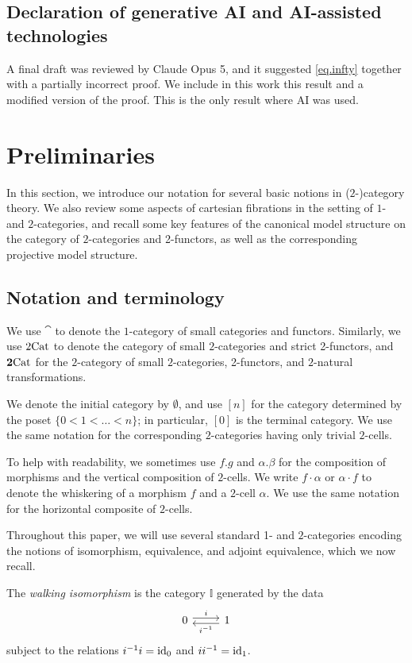 \documentclass[11pt, dvipsnames]{amsart}
\begin{document}
\subsection*{Declaration of generative AI and AI-assisted technologies} A final draft was reviewed by Claude Opus 5, and it suggested \cref{eq.infty} together with a partially incorrect proof. We include in this work this result and a modified version of the proof. This is the only result where AI was used.

\section{Preliminaries}\label{sec:preliminaries}
	In this section, we introduce our notation for several basic notions in ($2$-)category theory. We also review some aspects of cartesian fibrations in the setting of $1$- and $2$-categories, and recall some key features of the canonical model structure on the category of $2$-categories and 2-functors, as well as the corresponding projective model structure. 

    \subsection{Notation and terminology}
		We use $\cat$ to denote the $1$-category of small categories and functors. Similarly, we use $2\mathrm{Cat}$ to denote the category of small $2$-categories and strict 2-functors, and $\mathbf{2}\mathrm{Cat}$ for the $2$-category of small $2$-categories, 2-functors, and $2$-natural transformations. 

		We denote the initial category by $\emptyset$, and use $[n]$ for the category determined by the poset $\{0<1<\dots<n\}$; in particular, $[0]$ is the terminal category. We use the same notation for the corresponding $2$-categories having only trivial $2$-cells.

		To help with readability, we sometimes use $f.g$ and $\alpha.\beta$ for the composition of morphisms and the vertical composition of $2$-cells. We write $f\cdot \alpha$ or $\alpha\cdot f$ to denote the whiskering of a morphism $f$ and a $2$-cell $\alpha$. We use the same notation for the horizontal composite of $2$-cells.

		Throughout this paper, we will use several standard 1- and $2$-categories encoding the notions of isomorphism, equivalence, and adjoint equivalence, which we now recall. 
        
        
		\begin{defn}\label{walkingiso}
			The \emph{walking isomorphism}  is the category $\mathbb{I}$ generated by the data 
			\[\begin{tikzcd}
				0\rar[shift left,"i"] & 1\lar[shift left,"i^{-1}"]
			\end{tikzcd}\]
			subject to the relations $i^{-1}  i = \mathrm{id}_0$  and $i i^{-1} = \mathrm{id}_1$.
			\end{defn}
\end{document}
